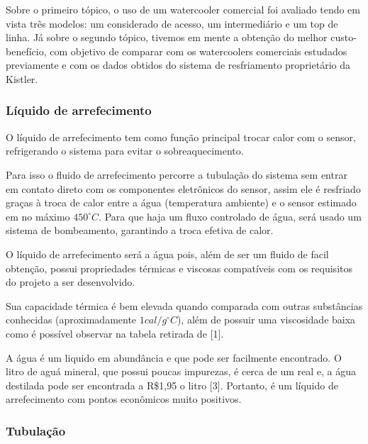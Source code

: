 Sobre o primeiro tópico, o uso de um watercooler comercial foi avaliado tendo em vista três modelos: um considerado de acesso, um intermediário e um top de linha. Já sobre o segundo tópico, tivemos em mente a obtenção do melhor custo-benefício, com objetivo de comparar com os watercoolers comerciais estudados previamente e com os dados obtidos do sistema de resfriamento proprietário da Kistler.

\subsubsection{Líquido de arrefecimento}

O líquido de arrefecimento tem como função principal trocar calor com o sensor, refrigerando o sistema para evitar o sobreaquecimento.

Para isso o fluido de arrefecimento percorre a tubulação do sistema sem entrar em contato direto com os componentes eletrônicos do sensor, assim ele é resfriado graças à troca de calor entre a água (temperatura ambiente) e o sensor estimado em no máximo $450^{\circ}C$.  Para que haja um fluxo controlado de água, será usado um sistema de bombeamento, garantindo a troca efetiva de calor.

O líquido de arrefecimento será a água pois, além de ser um fluido de facil obtenção, possui propriedades térmicas e viscosas compatíveis com os requisitos do projeto a ser desenvolvido.

Sua capacidade térmica é bem elevada quando comparada com outras substâncias conhecidas (aproximadamente $1cal/g^{\circ}C$), além de possuir uma viscosidade baixa como é possível observar na tabela retirada de [1].

A água é um liquido em abundância e que pode ser facilmente encontrado. O litro de aguá mineral, que possui poucas impurezas, é cerca de um real e, a água destilada pode ser encontrada a R\$1,95 o litro [3]. Portanto, é um líquido de arrefecimento com pontos econômicos muito positivos.

\subsubsection{Tubulação}

